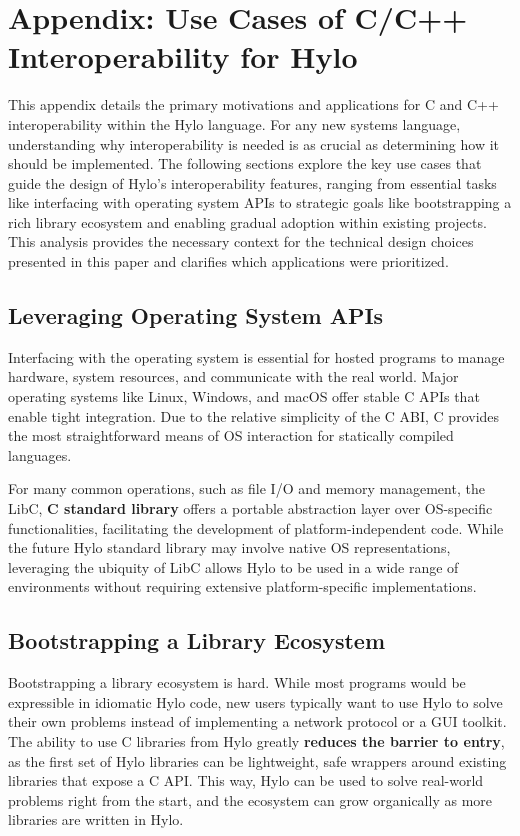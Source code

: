 \section{Appendix: Use Cases of C/C++ Interoperability for Hylo}
\label{app:use_cases_of_interop}
This appendix details the primary motivations and applications for C and C++ interoperability within the Hylo language. For any new systems language, understanding why interoperability is needed is as crucial as determining how it should be implemented. The following sections explore the key use cases that guide the design of Hylo's interoperability features, ranging from essential tasks like interfacing with operating system APIs to strategic goals like bootstrapping a rich library ecosystem and enabling gradual adoption within existing projects. This analysis provides the necessary context for the technical design choices presented in this paper and clarifies which applications were prioritized.

\subsection{Leveraging Operating System APIs}

Interfacing with the operating system is essential for hosted programs to manage hardware, system resources, and communicate with the real world. Major operating systems like Linux, Windows, and macOS offer stable C APIs that enable tight integration. Due to the relative simplicity of the C ABI, C provides the most straightforward means of OS interaction for statically compiled languages.

For many common operations, such as file I/O and memory management, the LibC, \textbf{C standard library} \cite{libc} offers a portable abstraction layer over OS-specific functionalities, facilitating the development of platform-independent code. While the future Hylo standard library may involve native OS representations, leveraging the ubiquity of LibC allows Hylo to be used in a wide range of environments without requiring extensive platform-specific implementations.

\subsection{Bootstrapping a Library Ecosystem}
Bootstrapping a library ecosystem is hard. While most programs would be expressible in idiomatic Hylo code, new users typically want to use Hylo to solve their own problems instead of implementing a network protocol or a GUI toolkit. The ability to use C libraries from Hylo greatly \textbf{reduces the barrier to entry}, as the first set of Hylo libraries can be lightweight, safe wrappers around existing libraries that expose a C API. This way, Hylo can be used to solve real-world problems right from the start, and the ecosystem can grow organically as more libraries are written in Hylo.

